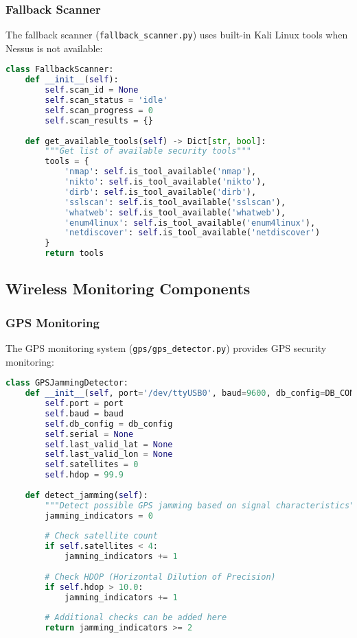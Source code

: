\documentclass[12pt,a4paper]{report}
\begin{document}
\subsubsection{Fallback Scanner}

The fallback scanner (\texttt{fallback\_scanner.py}) uses built-in Kali Linux tools when Nessus is not available:

\begin{lstlisting}[language=Python, caption=Fallback Scanner Implementation]
class FallbackScanner:
    def __init__(self):
        self.scan_id = None
        self.scan_status = 'idle'
        self.scan_progress = 0
        self.scan_results = {}
        
    def get_available_tools(self) -> Dict[str, bool]:
        """Get list of available security tools"""
        tools = {
            'nmap': self.is_tool_available('nmap'),
            'nikto': self.is_tool_available('nikto'),
            'dirb': self.is_tool_available('dirb'),
            'sslscan': self.is_tool_available('sslscan'),
            'whatweb': self.is_tool_available('whatweb'),
            'enum4linux': self.is_tool_available('enum4linux'),
            'netdiscover': self.is_tool_available('netdiscover')
        }
        return tools
\end{lstlisting}

\subsection{Wireless Monitoring Components}

\subsubsection{GPS Monitoring}

The GPS monitoring system (\texttt{gps/gps\_detector.py}) provides GPS security monitoring:

\begin{lstlisting}[language=Python, caption=GPS Detector Implementation]
class GPSJammingDetector:
    def __init__(self, port='/dev/ttyUSB0', baud=9600, db_config=DB_CONFIG):
        self.port = port
        self.baud = baud
        self.db_config = db_config
        self.serial = None
        self.last_valid_lat = None
        self.last_valid_lon = None
        self.satellites = 0
        self.hdop = 99.9
        
    def detect_jamming(self):
        """Detect possible GPS jamming based on signal characteristics"""
        jamming_indicators = 0
        
        # Check satellite count
        if self.satellites < 4:
            jamming_indicators += 1
            
        # Check HDOP (Horizontal Dilution of Precision)
        if self.hdop > 10.0:
            jamming_indicators += 1
            
        # Additional checks can be added here
        return jamming_indicators >= 2
\end{lstlisting}
\end{document}
